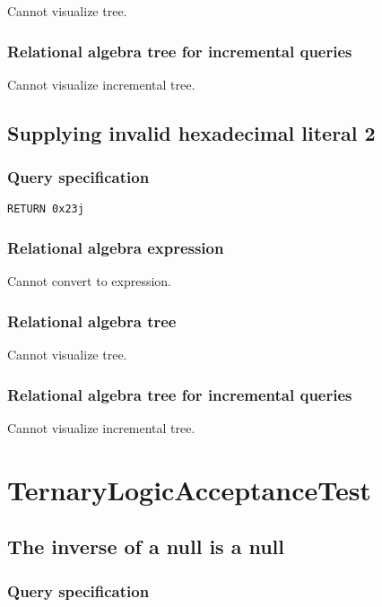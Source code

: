 Cannot visualize tree.

\subsubsection*{Relational algebra tree for incremental queries}

Cannot visualize incremental tree.

\subsection{Supplying invalid hexadecimal literal 2}

\subsubsection*{Query specification}

\begin{lstlisting}
RETURN 0x23j
\end{lstlisting}

\subsubsection*{Relational algebra expression}

Cannot convert to expression.

\subsubsection*{Relational algebra tree}

Cannot visualize tree.

\subsubsection*{Relational algebra tree for incremental queries}

Cannot visualize incremental tree.

\section{TernaryLogicAcceptanceTest}

\subsection{The inverse of a null is a null}

\subsubsection*{Query specification}

